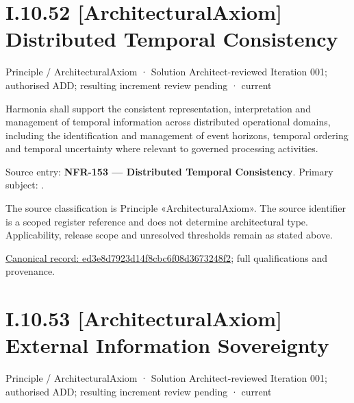 \section*{I.10.52 [ArchitecturalAxiom] Distributed Temporal Consistency}
\label{navigation:I.10.52}

\label{element:ed3e8d7923d14f8cbc6f08d3673248f2}
{\small Principle / ArchitecturalAxiom · Solution Architect-reviewed Iteration 001; authorised ADD; resulting increment review pending · current}\par

Harmonia shall support the consistent representation, interpretation and management of temporal information across distributed operational domains, including the identification and management of event horizons, temporal ordering and temporal uncertainty where relevant to governed processing activities.



Source entry: \textbf{NFR-153 — Distributed Temporal Consistency}. Primary subject: \texttt{}.



The source classification is Principle «ArchitecturalAxiom». The source identifier is a scoped register reference and does not determine architectural type. Applicability, release scope and unresolved thresholds remain as stated above.


{\footnotesize \href{../../../../continuum/motivation/principle/architectural-axiom/ed3e8d7923d14f8cbc6f08d3673248f2.md}{Canonical record: ed3e8d7923d14f8cbc6f08d3673248f2}; full qualifications and provenance.}\par
\section*{I.10.53 [ArchitecturalAxiom] External Information Sovereignty}
\label{navigation:I.10.53}

\label{element:aa179ef5bdf44b4eab3f2c855a8798d2}
{\small Principle / ArchitecturalAxiom · Solution Architect-reviewed Iteration 001; authorised ADD; resulting increment review pending · current}\par


